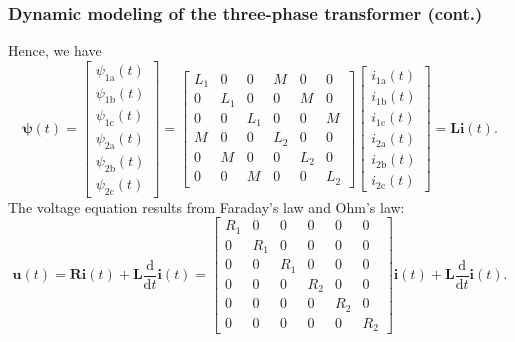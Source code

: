 \begin{frame}
	\frametitle{Dynamic modeling of the three-phase transformer (cont.)}
	Hence, we have
		\begin{equation}
			\bm{\psi}(t) = \begin{bmatrix} \psi_{1\mathrm{a}}(t) \\ \psi_{1\mathrm{b}}(t) \\ \psi_{1\mathrm{c}}(t) \\ \psi_{2\mathrm{a}}(t) \\ \psi_{2\mathrm{b}}(t) \\ \psi_{2\mathrm{c}}(t)\end{bmatrix} = \begin{bmatrix} L_{1} & 0 & 0 & M & 0 & 0 \\ 0 & L_{1} & 0 & 0 & M & 0 \\ 0 & 0 & L_{1} & 0 & 0 & M \\ M & 0 & 0 & L_{2} & 0 &0 \\ 0 & M & 0 & 0 & L_{2} & 0 \\ 0 & 0 & M & 0 & 0 &L_{2}\end{bmatrix} \begin{bmatrix} i_{1\mathrm{a}}(t) \\ i_{1\mathrm{b}}(t) \\ i_{1\mathrm{c}}(t) \\ i_{2\mathrm{a}}(t) \\ i_{2\mathrm{b}}(t) \\ i_{2\mathrm{c}}(t)\end{bmatrix} = \bm{L}\bm{i}(t).
			\label{eq:Three_phase_transformer_flux_linkage}
		\end{equation}
		\pause
		The voltage equation results from Faraday's law and Ohm's law:
		\begin{equation}
			\bm{u}(t) = \bm{R}\bm{i}(t)+ \bm{L}\frac{\mathrm{d}}{\mathrm{d}t}\bm{i}(t) = \begin{bmatrix} R_{1} & 0 & 0 & 0 & 0 & 0 \\ 0 & R_{1} & 0 & 0 & 0 & 0 \\ 0 & 0 & R_{1} & 0 & 0 & 0 \\ 0 & 0 & 0 & R_{2} & 0 &0 \\ 0 & 0 & 0 & 0 & R_{2} & 0 \\ 0 & 0 & 0 & 0 & 0 &R_{2}\end{bmatrix}\bm{i}(t)+ \bm{L}\frac{\mathrm{d}}{\mathrm{d}t}\bm{i}(t).
		\end{equation}
\end{frame}

